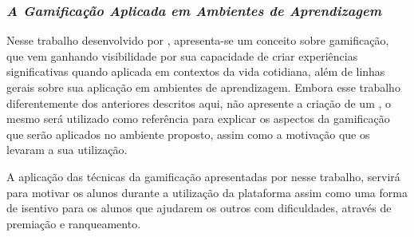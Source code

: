 \subsubsection{\textit{A Gamificação Aplicada em Ambientes de Aprendizagem}}

Nesse trabalho desenvolvido por , apresenta-se um conceito sobre gamificação, que vem ganhando visibilidade por sua capacidade de criar experiências significativas quando aplicada em  contextos  da  vida  cotidiana, além de linhas gerais sobre sua aplicação em ambientes de aprendizagem. Embora esse trabalho diferentemente dos anteriores descritos aqui, não apresente a criação de um \SystemType, o mesmo será utilizado como referência para explicar os aspectos da gamificação que serão aplicados no ambiente proposto, assim como a motivação que os levaram a sua utilização.

A aplicação das técnicas da gamificação apresentadas por  nesse trabalho, servirá para motivar os alunos durante a utilização da plataforma assim como uma forma de isentivo para os alunos que ajudarem os outros com dificuldades, através de premiação e ranqueamento.













